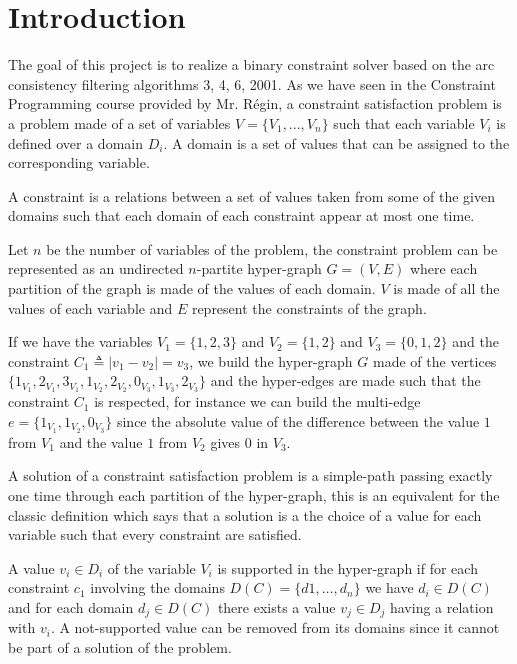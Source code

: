 \documentclass{rapport}
\begin{document}
\maketitle

\section{Introduction}

The goal of this project is to realize a binary constraint solver based on the arc consistency filtering algorithms \ac{3}, \ac{4}, \ac{6}, \ac{2001}. As we have seen in the Constraint Programming course provided by Mr. Régin, a constraint satisfaction problem is a problem made of a set of variables $V = \{V_1, ..., V_n\}$ such that each variable $V_i$ is defined over a domain $D_i$. A domain is a set of values that can be assigned to the corresponding variable.

A constraint is a relations between a set of values taken from some of the given domains such that each domain of each constraint appear at most one time.

Let $n$ be the number of variables of the problem, the constraint problem can be represented as an undirected $n$-partite hyper-graph $G = (V, E)$ where each partition of the graph is made of the values of each domain. $V$ is made of all the values of each variable and $E$ represent the constraints of the graph.

\begin{example}
  \label{ex:p1}
  If we have the variables $V_1 = \{1, 2, 3\}$ and $V_2 = \{1, 2\}$ and $V_3 = \{0, 1, 2\}$ and the constraint $C_1 \triangleq |v_1 - v_2| = v_3$, we build the hyper-graph $G$ made of the vertices $\{1_{V_1}, 2_{V_1}, 3_{V_1}, 1_{V_2}, 2_{V_2}, 0_{V_3}, 1_{V_3}, 2_{V_3}\}$ and the hyper-edges are made such that the constraint $C_1$ is respected, for instance we can build the multi-edge $e = \{1_{V_1}, 1_{V_2}, 0_{V_3}\}$ since the absolute value of the difference between the value $1$ from $V_1$ and the value $1$ from $V_2$ gives $0$ in $V_3$.
\end{example}

A solution of a constraint satisfaction problem is a simple-path passing exactly one time through each partition of the hyper-graph, this is an equivalent for the classic definition which says that a solution is a the choice of a value for each variable such that every constraint are satisfied.

A value $v_i \in D_i$ of the variable $V_i$ is supported in the hyper-graph if for each constraint $c_1$ involving the domains $D(C) = \{d1, \dots, d_n\}$ we have $d_i \in D(C)$ and for each domain $d_j \in D(C)$ there exists a value $v_j \in D_j$ having a relation with $v_i$. A not-supported value can be removed from its domains since it cannot be part of a solution of the problem.
\end{document}
